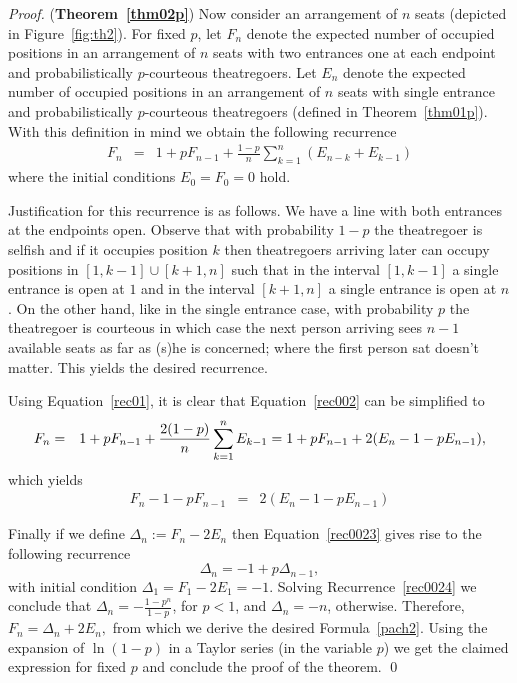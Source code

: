 \documentclass[11pt]{llncs}
\begin{document}
\begin{proof} ({\bf Theorem~\ref{thm02p}})
Now consider an arrangement of $n$ seats
(depicted in Figure~\ref{fig:th2}).
For fixed $p$,
let $F_n$ denote the expected number of occupied
positions  in an arrangement of $n$ seats
with two entrances one at each endpoint 
and probabilistically $p$-courteous
theatregoers.
Let $E_n$ denote the expected number of occupied
positions  in an arrangement of $n$ seats
with single entrance 
and probabilistically $p$-courteous
theatregoers (defined in Theorem~\ref{thm01p}).
With this definition in mind we obtain the following
recurrence
\begin{eqnarray}
F_n 
&=& \label{rec002}
1 + p F_{n-1} 
+  \frac{1-p}{n} \sum_{k=1}^n (E_{n-k} + E_{k-1})
\end{eqnarray}
where the initial conditions $E_0 = F_0 =0$ hold.

Justification for this recurrence is as follows.
We have a line
with both entrances at the endpoints open. 
Observe that with probability $1-p$
the theatregoer is selfish and if it occupies
position $k$ then theatregoers arriving later
can occupy positions in $[1, k-1] \cup [k+1, n]$
such that in the interval $[1, k-1]$
a single entrance is open at $1$ and 
in the interval $[k+1, n]$ a single
entrance is open at $n$.
On the
other hand, like in the single entrance case,
with probability $p$ the theatregoer is courteous in which case the next person
arriving sees $n - 1$ 
available seats as far as (s)he is concerned; where the first
person sat doesn't matter.
This yields the desired recurrence.

Using Equation~\eqref{rec01},
it is clear that Equation~\eqref{rec002} can be simplified to
\begin{eqnarray}
F_n 
&=& \notag 1 + p F_{n-1} 
+  \frac{2(1-p)}{n} \sum_{k=1}^n E_{k-1}
= \notag 1 + p F_{n-1} 
+  2(E_n -1 -p E_{n-1}),
\end{eqnarray}
which yields
\begin{eqnarray}
F_n -1 - p F_{n-1} 
&=&
\label{rec0023} 
2(E_n -1 -p E_{n-1}) 
\end{eqnarray}

Finally if we define $\Delta_n := F_n -2E_n$ then Equation~\eqref{rec0023} 
gives rise to the following recurrence
\begin{equation}
\label{rec0024} 
\Delta_n = -1 + p \Delta_{n-1},
\end{equation}
with initial condition $\Delta_1 = F_1 - 2E_1 = - 1$.
Solving Recurrence~\eqref{rec0024} we conclude that
$\Delta_n = -\frac{1-p^n}{1-p}$, for $p<1$, and $\Delta_n =-n$,
otherwise. Therefore,
$
F_n = \Delta_n + 2E_n ,
$
from which we derive the desired Formula~\eqref{pach2}. 
Using the expansion of $\ln (1-p)$ in a Taylor series (in the variable $p$)
we get the claimed expression for fixed $p$
and conclude the proof
of the theorem.
\qed
\end{proof}
\end{document}
